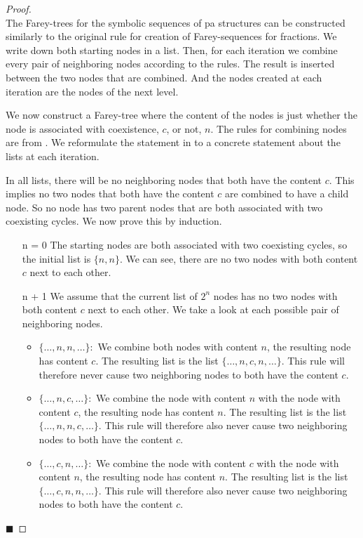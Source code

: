 \begin{proof} \phantom{x} \\
	The Farey-trees for the symbolic sequences of \gls{pa} structures can be constructed similarly to the original rule for creation of Farey-sequences for fractions.
	We write down both starting nodes in a list.
	Then, for each iteration we combine every pair of neighboring nodes according to the rules.
	The result is inserted between the two nodes that are combined.
	And the nodes created at each iteration are the nodes of the next level.

	We now construct a Farey-tree where the content of the nodes is just whether the node is associated with coexistence, $c$, or not, $n$.
	The rules for combining nodes are from .
	We reformulate the statement in  to a concrete statement about the lists at each iteration.

	In all lists, there will be no neighboring nodes that both have the content $c$.
	This implies no two nodes that both have the content $c$ are combined to have a child node.
	So no node has two parent nodes that are both associated with two coexisting cycles.
	We now prove this by induction.

	\begin{itemize}
		\item[n = 0] The starting nodes are both associated with two coexisting cycles, so the initial list is $\{n, n\}$.
			We can see, there are no two nodes with both content $c$ next to each other. \checkmark
		\item[n + 1] We assume that the current list of $2^n$ nodes has no two nodes with both content $c$ next to each other.
			We take a look at each possible pair of neighboring nodes.
			\begin{itemize}
				\item $\{\dots, n, n, \dots\}:$ We combine both nodes with content $n$, the resulting node has content $c$.
				      The resulting list is the list $\{\dots, n, c, n, \dots\}$.
				      This rule will therefore never cause two neighboring nodes to both have the content $c$.
				\item $\{\dots, n, c, \dots\}:$ We combine the node with content $n$ with the node with content $c$, the resulting node has content $n$.
				      The resulting list is the list $\{\dots, n, n, c, \dots\}$.
				      This rule will therefore also never cause two neighboring nodes to both have the content $c$.
				\item $\{\dots, c, n, \dots\}:$ We combine the node with content $c$ with the node with content $n$, the resulting node has content $n$.
				      The resulting list is the list $\{\dots, c, n, n, \dots\}$.
				      This rule will therefore also never cause two neighboring nodes to both have the content $c$.
			\end{itemize}
	\end{itemize}
	\hfill $\blacksquare$
\end{proof}
